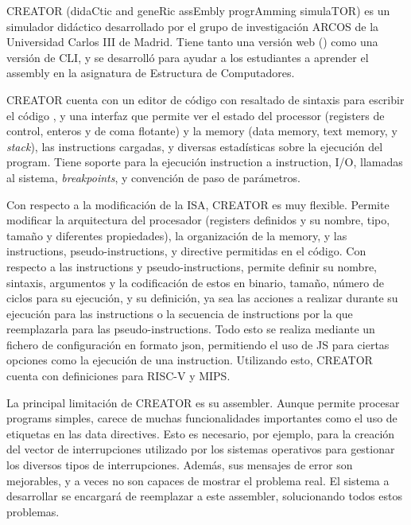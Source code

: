CREATOR (didaCtic and geneRic assEmbly progrAmming simulaTOR)
\parencite{CREATOR} es un simulador didáctico desarrollado por el grupo de
investigación ARCOS de la Universidad Carlos III de Madrid. Tiene tanto una
versión web () como una versión de \gls{CLI}, y se desarrolló
para ayudar a los estudiantes a aprender el \gls{assembly} en la asignatura de
Estructura de Computadores.

CREATOR cuenta con un editor de código con resaltado de sintaxis para escribir
el código , y una interfaz que permite ver el
estado del \gls{processor} (\glspl{register} de control, enteros y de coma
flotante) y la \gls{memory} (\gls{data memory}, \gls{text memory}, y
\textit{stack}), las \glspl{instruction} cargadas, y diversas estadísticas sobre
la ejecución del \gls{program}. Tiene soporte para la ejecución
\gls{instruction} a \gls{instruction}, I/O, llamadas al sistema,
\textit{breakpoints}, y convención de paso de parámetros.

Con respecto a la modificación de la \gls{ISA}, CREATOR es muy flexible. Permite
modificar la arquitectura del procesador (\glspl{register} definidos y su
nombre, tipo, tamaño y diferentes propiedades), la organización de la
\gls{memory}, y las \glspl{instruction}, \glspl{pseudo-instruction}, y
\gls{directive} permitidas en el código. Con respecto a las \glspl{instruction}
y \glspl{pseudo-instruction}, permite definir su nombre, sintaxis, argumentos y
la codificación de estos en binario, tamaño, número de ciclos para su ejecución,
y su definición, ya sea las acciones a realizar durante su ejecución para las
\glspl{instruction} o la secuencia de \glspl{instruction} por la que
reemplazarla para las \glspl{pseudo-instruction}. Todo esto se realiza mediante
un fichero de configuración en formato \gls{json}, permitiendo el uso de
\gls{JS} para ciertas opciones como la ejecución de una \gls{instruction}.
Utilizando esto, CREATOR cuenta con definiciones para RISC-V y MIPS.

La principal limitación de CREATOR es su \gls{assembler}. Aunque permite
procesar \glspl{program} simples, carece de muchas funcionalidades importantes
como el uso de etiquetas en las \glspl{data directive}. Esto es necesario, por
ejemplo, para la creación del vector de interrupciones utilizado por los
sistemas operativos para gestionar los diversos tipos de interrupciones. Además,
sus mensajes de error son mejorables, y a veces no son capaces de mostrar el
problema real. El sistema a desarrollar se encargará de reemplazar a este
\gls{assembler}, solucionando todos estos problemas.

